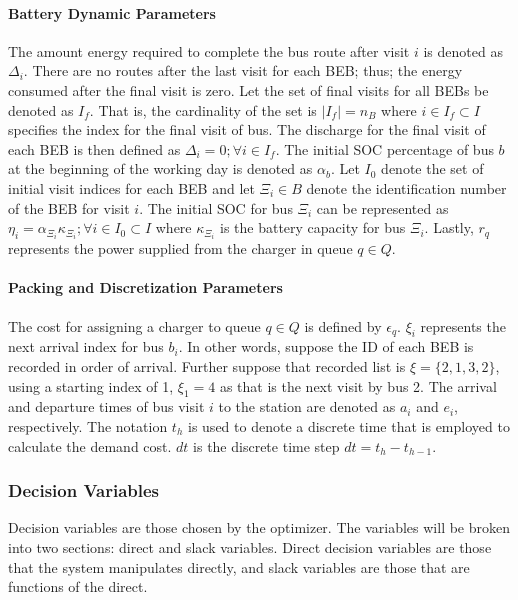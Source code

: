 \documentclass[ee,thesis]{usuthesis}
\newcommand{\Iset}{I}                       %
\newcommand{\Isetinit}{I_0}                 %
\newcommand{\Isetfinal}{I_f}                %
\begin{document}
\paragraph{Battery Dynamic Parameters}
\label{sec:battery-dynamic-parameters}
The amount energy required to complete the bus route after visit \(i\) is denoted as \(\Delta_i\). There are no routes after the
last visit for each BEB; thus; the energy consumed after the final visit is zero. Let the set of final visits for all
BEBs be denoted as \(\Isetfinal\). That is, the cardinality of the set is \(\lvert \Isetfinal \rvert = n_B\) where \(i \in
\Isetfinal \subset \Iset\) specifies the index for the final visit of bus. The discharge for the final visit of each BEB is
then defined as \(\Delta_{i} = 0; \forall i \in \Isetfinal\). The initial SOC percentage of bus \(b\) at the beginning of the working day
is denoted as \(\alpha_b\). Let \(\Isetinit\) denote the set of initial visit indices for each BEB and let \(\Xi_i \in B\) denote the
identification number of the BEB for visit \(i\). The initial SOC for bus \(\Xi_i\) can be represented as \(\eta_{i} =
\alpha_{\Xi_i}\kappa_{\Xi_i}; \forall i \in \Isetinit \subset \Iset\) where \(\kappa_{\Xi_i}\) is the battery capacity for bus \(\Xi_i\). Lastly, \(r_q\) represents
the power supplied from the charger in queue \(q \in Q\).

\paragraph{Packing and Discretization Parameters}
\label{sec:packing-and-discretization-paramaters}
The cost for assigning a charger to queue \(q \in Q\) is defined by \(\epsilon_q\). \(\xi_i\) represents the next arrival index for bus
\(b_i\). In other words, suppose the ID of each BEB is recorded in order of arrival. Further suppose that recorded list is
\(\xi = \{ 2,1,3,2 \}\), using a starting index of 1, \(\xi_1 = 4\) as that is the next visit by bus 2. The arrival and
departure times of bus visit \(i\) to the station are denoted as \(a_i\) and \(e_i\), respectively. The notation \(t_h\) is used
to denote a discrete time that is employed to calculate the demand cost. \(dt\) is the discrete time step \(dt = t_h -
t_{h-1}\).

\subsubsection{Decision Variables}
\label{sec:decision-variables}
Decision variables are those chosen by the optimizer. The variables will be broken into two sections: direct and slack
variables. Direct decision variables are those that the system manipulates directly, and slack variables are those that
are functions of the direct.
\end{document}
